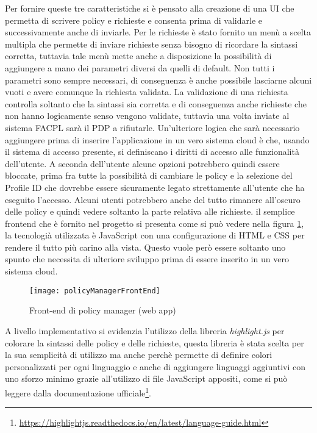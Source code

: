 Per fornire queste tre caratteristiche si è pensato alla creazione di una UI che permetta di scrivere policy e richieste e consenta prima di validarle e successivamente anche di inviarle. Per le richieste è stato fornito un menù a scelta multipla che permette di inviare richieste senza bisogno di ricordare la sintassi corretta, tuttavia tale menù mette anche a disposizione la possibilità di aggiungere a mano dei parametri diversi da quelli di default. Non tutti i parametri sono sempre necessari, di conseguenza è anche possibile lasciarne alcuni vuoti e avere comunque la richiesta validata. La validazione di una richiesta controlla soltanto che la sintassi sia corretta e di conseguenza anche richieste che non hanno logicamente senso vengono validate, tuttavia una volta inviate al sistema FACPL sarà il PDP a rifiutarle.\medbreak
Un'ulteriore logica che sarà necessario aggiungere prima di inserire l'applicazione in un vero sistema cloud è che, usando il sistema di accesso presente, si definiscano i diritti di accesso alle funzionalità dell'utente. A seconda dell'utente alcune opzioni potrebbero quindi essere bloccate, prima fra tutte la possibilità di cambiare le policy e la selezione del Profile ID che dovrebbe essere sicuramente legato strettamente all'utente che ha eseguito l'accesso. Alcuni utenti potrebbero anche del tutto rimanere all'oscuro delle policy e quindi vedere soltanto la parte relativa alle richieste.\medbreak
il semplice frontend che è fornito nel progetto si presenta come si può vedere nella figura \ref{fig:policyManagerFrontEnd}, la tecnologià utilizzata è JavaScript con una configurazione di HTML e CSS per rendere il tutto più carino alla vista. Questo vuole però essere soltanto uno spunto che necessita di ulteriore sviluppo prima di essere inserito in un vero sistema cloud.
\begin{figure}[H]
    \begin{center}
    \texttt{[image: policyManagerFrontEnd]}
    \caption{Front-end di policy manager (web app)}
    \label{fig:policyManagerFrontEnd}
    \end{center}
\end{figure}
A livello implementativo si evidenzia l'utilizzo della libreria \emph{highlight.js}\cite{highlightjs} per colorare la sintassi delle policy e delle richieste, questa libreria è stata scelta per la sua semplicità di utilizzo ma anche perchè permette di definire colori personalizzati per ogni linguaggio e anche di aggiungere linguaggi aggiuntivi con uno sforzo minimo grazie all'utilizzo di file JavaScript appositi, come si può leggere dalla documentazione ufficiale\footnote{\url{https://highlightjs.readthedocs.io/en/latest/language-guide.html}}.\medbreak

